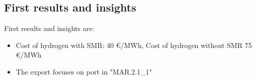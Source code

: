 

\subsection{First results and insights}

First results and insights are:
\begin{itemize}
    \item Cost of hydrogen with SMR: 40 €/MWh, Cost of hydrogen without SMR 75 €/MWh
    \item The export focuses on port in "MAR.2.1{\_}1"
\end{itemize}


